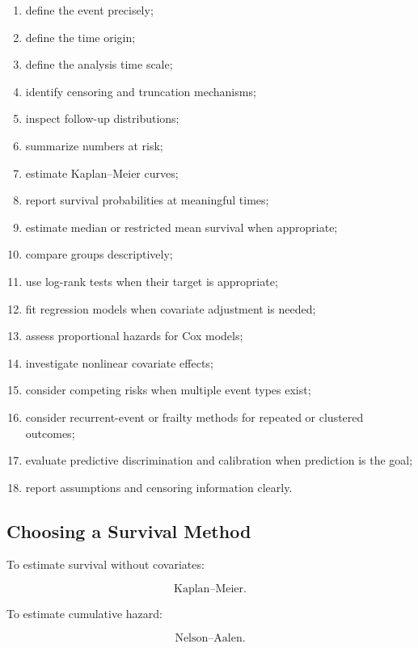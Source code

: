 \begin{enumerate}
    \item define the event precisely;
    \item define the time origin;
    \item define the analysis time scale;
    \item identify censoring and truncation mechanisms;
    \item inspect follow-up distributions;
    \item summarize numbers at risk;
    \item estimate Kaplan--Meier curves;
    \item report survival probabilities at meaningful times;
    \item estimate median or restricted mean survival when appropriate;
    \item compare groups descriptively;
    \item use log-rank tests when their target is appropriate;
    \item fit regression models when covariate adjustment is needed;
    \item assess proportional hazards for Cox models;
    \item investigate nonlinear covariate effects;
    \item consider competing risks when multiple event types exist;
    \item consider recurrent-event or frailty methods for repeated or
          clustered outcomes;
    \item evaluate predictive discrimination and calibration when
          prediction is the goal;
    \item report assumptions and censoring information clearly.
\end{enumerate}

\subsection{Choosing a Survival Method}
\label{subsec:choosing-survival-method}

To estimate survival without covariates:

\[
\boxed{
\text{Kaplan--Meier}.
}
\]

To estimate cumulative hazard:

\[
\boxed{
\text{Nelson--Aalen}.
}
\]

